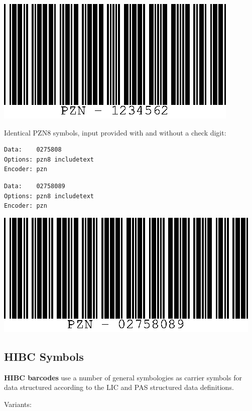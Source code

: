 \includegraphics{images/pzn-1.eps}

Identical PZN8 symbols, input provided with and without a check digit:

\begin{verbatim}
Data:    0275808
Options: pzn8 includetext
Encoder: pzn
\end{verbatim}

\begin{verbatim}
Data:    02758089
Options: pzn8 includetext
Encoder: pzn
\end{verbatim}

\includegraphics{images/pzn-2.eps}

\hypertarget{hibc-symbols}{%
\subsection{HIBC Symbols}\label{hibc-symbols}}

\textbf{HIBC barcodes} use a number of general symbologies as carrier
symbols for data structured according to the LIC and PAS structured data
definitions.

Variants:

